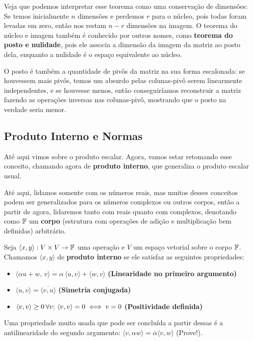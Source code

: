 \documentclass[11pt, a4paper]{article}
\begin{document}
Veja que podemos interpretar esse teorema como uma conservação de dimensões: Se temos inicialmente \(n\) dimensões e perdemos \(r\) para o núcleo, pois todas foram levadas em zero, então nos restam \(n-r\) dimensões na imagem. O teorema do núcleo e imagem também é conhecido por outros nomes, como \textbf{teorema do posto e nulidade}, pois ele associa a dimensão da imagem da matriz ao posto dela, enquanto a nulidade é o espaço equivalente ao núcleo. 

O posto é também a quantidade de pivôs da matriz na sua forma escalonada: se houvessem mais pivôs, temos um absurdo pelas colunas-pivô serem linearmente independentes, e se houvesse menos, então conseguiríamos reconstruir a matriz fazendo as operações inversas nas colunas-pivô, mostrando que o posto na verdade seria menor.

\subsection{Produto Interno e Normas}

Até aqui vimos sobre o produto escalar. Agora, vamos estar retomando esse conceito, chamando agora de \textbf{produto interno}, que generaliza o produto escalar usual.

Até aqui, lidamos somente com os números reais, mas muitos desses conceitos podem ser generalizados para os números complexos ou outros corpos, então a partir de agora, lidaremos tanto com reais quanto com complexos, denotando como \(\AlgBody\)  um \textbf{corpo} (estrutura com operações de adição e multiplicação bem definidas) arbitrário.

Seja \(\langle x,y\rangle:V\times V\to \AlgBody\) uma operação e \(V\) um espaço vetorial sobre o corpo \(\AlgBody\). Chamamos \(\langle x,y\rangle\) de \textbf{produto interno} se ele satisfaz as seguintes propriedades:
\begin{itemize}
  \item \(
    \langle \alpha u + w,\,v\rangle = \alpha\,\langle u,v\rangle + \langle w,v\rangle
  \) \textbf{(Linearidade no primeiro argumento)} 
  \item \(
    \langle u,v\rangle = \overline{\langle v,u\rangle}
  \) \textbf{(Simetria conjugada)}
  \item \(
    \langle v,v\rangle \ge 0 \tb[0.2]\forall v;\tb[0.2]
    \langle v,v\rangle = 0 \iff v=0
  \) \textbf{(Positividade definida)}
\end{itemize}

Uma propriedade muito usada que pode ser concluída a partir dessas é a antilinearidade do segundo argumento: \(\langle v,\alpha w\rangle = \overline{\alpha}\langle v,w \rangle\) (Prove!).
\end{document}
